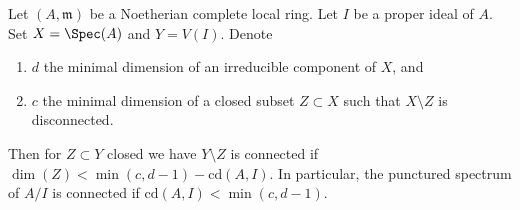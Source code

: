 \begin{lemma}
\label{lemma-punctured-still-connected}
\begin{reference}
\cite[Theorem 1.6]{Varbaro}
\end{reference}
Let $(A, \mathfrak m)$ be a Noetherian complete local ring.
Let $I$ be a proper ideal of $A$.
Set $X = \Spec(A)$ and $Y = V(I)$.
Denote
\begin{enumerate}
\item $d$ the minimal dimension of an irreducible component of $X$, and
\item $c$ the minimal dimension of a closed subset $Z \subset X$
such that $X \setminus Z$ is disconnected.
\end{enumerate}
Then for $Z \subset Y$ closed we have $Y \setminus Z$ is connected if
$\dim(Z) < \min(c, d - 1) - \text{cd}(A, I)$. In particular, the punctured
spectrum of $A/I$ is connected if $\text{cd}(A, I) < \min(c, d - 1)$.
\end{lemma}

